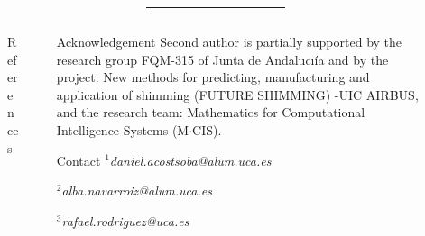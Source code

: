 \documentclass[final]{beamer}
\newlength{\sepmargin}
\newlength{\sepwid}
\newlength{\onecolwid}
\begin{document}
\begin{frame}[t]
  \vspace*{0.5cm}
  \begin{columns}[t]
    \begin{column}{\sepmargin}\end{column}
    \begin{column}{0.97\linewidth}
      {\color{blueMUW}\rule{1.012\textwidth}{10pt}}
    \end{column}
    \begin{column}{\sepmargin}\end{column}
  \end{columns}

  \vspace*{-1cm}
  \begin{columns}[t] %

    \begin{column}{\sepmargin} \end{column}
    \begin{column}{\onecolwid}
      \begin{block}{\large References}
        \vspace*{-0.5cm}
        \nocite{*} %
        {\footnotesize
          }
      \end{block}
    \end{column} %
    \begin{column}{\sepwid}  \end{column}

    \begin{column}{\onecolwid}
      \begin{block}{\large Acknowledgement}
        \vspace*{-0.5cm}
        \footnotesize Second author is partially supported by the research group FQM-315 of Junta de Andalucı\'ia and by the project: New methods for predicting, manufacturing and application of shimming (FUTURE SHIMMING) -UIC AIRBUS, and the research team: Mathematics for Computational Intelligence Systems (M$\cdot$CIS).
      \end{block}
      \vspace*{-0.5cm}

      \begin{block}{\large Contact}
        \vspace*{-0.5cm}
        \footnotesize
        $^1$\emph{daniel.acostsoba@alum.uca.es}

        $^2$\emph{alba.navarroiz@alum.uca.es}

        $^3$\emph{rafael.rodriguez@uca.es}
      \end{block}
    \end{column}

    \begin{column}{\sepmargin}\end{column} %



  \end{columns} %

\end{frame} %
\end{document}
